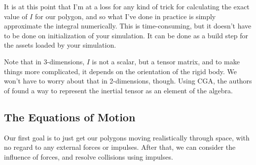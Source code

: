 \documentclass[12pt]{article}
\begin{document}
It is at this point that I'm at a loss for any kind of trick for calculating the exact value of $I$ for our polygon, and so
what I've done in practice is simply approximate the integral numerically.  This is time-consuming, but it doesn't have
to be done on initialization of your simulation.  It can be done as a build step for the assets loaded by your
simulation.

Note that in 3-dimensions, $I$ is not a scalar, but a tensor matrix, and to make things more complicated, it
depends on the orientation of the rigid body.  We won't have to worry about that in 2-dimensions, though.
Using CGA, the authors of \cite{} found a way to represent the inertial tensor as an element of the algebra.

\subsection{The Equations of Motion}


Our first goal is to just get our polygons moving realistically through space, with no regard to any external forces or impulses.
After that, we can consider the influence of forces, and resolve collisions using impulses.


\end{document}
